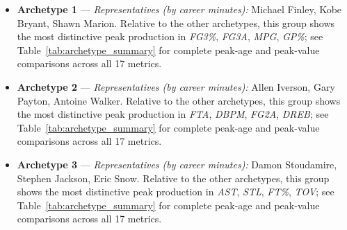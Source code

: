 \begin{itemize}
\item \textbf{Archetype 1} --- \emph{Representatives (by career minutes):} Michael Finley, Kobe Bryant, Shawn Marion. Relative to the other archetypes, this group shows the most distinctive peak production in \textit{FG3\%}, \textit{FG3A}, \textit{MPG}, \textit{GP\%}; see Table~\ref{tab:archetype_summary} for complete peak-age and peak-value comparisons across all 17 metrics.
\item \textbf{Archetype 2} --- \emph{Representatives (by career minutes):} Allen Iverson, Gary Payton, Antoine Walker. Relative to the other archetypes, this group shows the most distinctive peak production in \textit{FTA}, \textit{DBPM}, \textit{FG2A}, \textit{DREB}; see Table~\ref{tab:archetype_summary} for complete peak-age and peak-value comparisons across all 17 metrics.
\item \textbf{Archetype 3} --- \emph{Representatives (by career minutes):} Damon Stoudamire, Stephen Jackson, Eric Snow. Relative to the other archetypes, this group shows the most distinctive peak production in \textit{AST}, \textit{STL}, \textit{FT\%}, \textit{TOV}; see Table~\ref{tab:archetype_summary} for complete peak-age and peak-value comparisons across all 17 metrics.
\end{itemize}

